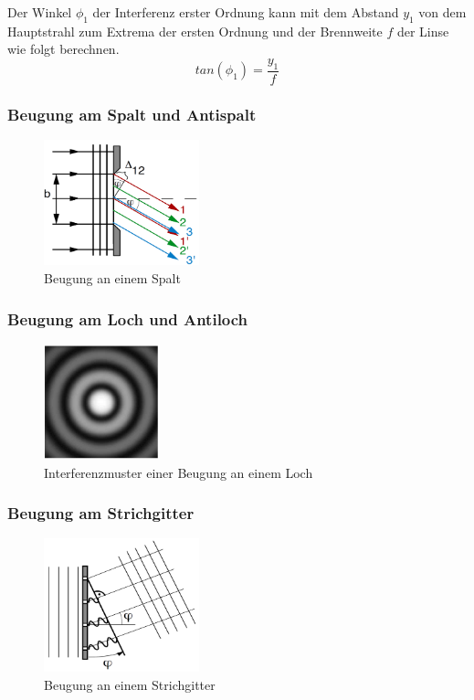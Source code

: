 Der Winkel $ \phi_{1} $ der Interferenz erster Ordnung kann mit dem Abstand $ y_{1} $ von dem Hauptstrahl zum Extrema der ersten Ordnung und der Brennweite $ f $ der Linse wie folgt berechnen.
\begin{equation}\label{eq:frauenhofer}
tan(\phi_{1}) =  \frac{y_{1}}{f}
\end{equation}

\subsubsection{Beugung am Spalt und Antispalt}

\begin{figure}[h!]
	\centering
	\includegraphics[width=0.4\textwidth]{data/spalt}
	\caption{Beugung an einem Spalt}
	\label{fig:spalt}
\end{figure}

\subsubsection{Beugung am Loch und Antiloch}

\begin{figure}[h!]
	\centering
	\includegraphics[width=0.3\textwidth]{data/loch}
	\caption{Interferenzmuster einer Beugung an einem Loch}
	\label{fig:loch}
\end{figure}

\subsubsection{Beugung am Strichgitter}

\begin{figure}[h!]
	\centering
	\includegraphics[width=0.4\textwidth]{data/gitter}
	\caption{Beugung an einem Strichgitter}
	\label{fig:gitter}
\end{figure}


